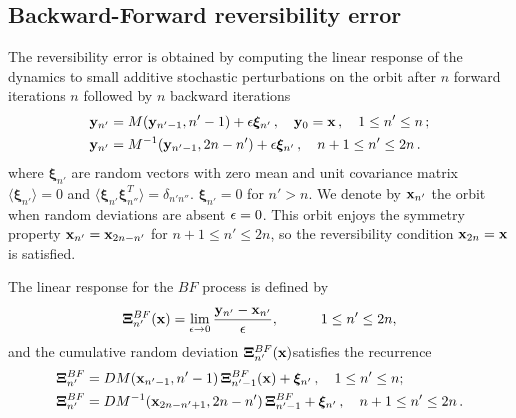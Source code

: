 \subsection{Backward-Forward reversibility error\label{subsection:bf}}
%
The reversibility error is obtained by computing the linear response of the dynamics to small additive stochastic perturbations on the orbit after $n$ forward iterations $n$ followed by $n$ backward iterations 
%
\begin{equation}
 \begin{split}
   &{\bf y}_{n'}  = M({\bf y}_{n'-1},n'-1) +\epsilon\boldsymbol{\xi}_{n'} \, ,  \quad {\bf y}_0={\bf x} \, , \quad 1\le n'\le n \, ; \\ 
   &{\bf y}_{n'} = M^{-1}({\bf y}_{ n'-1}, 2n-n')+\epsilon   \boldsymbol{\xi}_{n' } \, , \quad n+1\le n'\le 2n \, .
  \end{split}
\label{eq2-8}
\end{equation}
%
where $\boldsymbol{\xi}_{n'}$ are random vectors with zero mean and unit covariance matrix $\langle\boldsymbol{\xi}_{n'}\rangle=0$  and $\langle\boldsymbol{\xi}_{n'} \boldsymbol{\xi}_{n''}^T\rangle=\delta_{n' n''}$.
$\boldsymbol{\xi}_{n'}=0$ for $n'>n$. We denote by ${\bf x}_{n'}$ the orbit when random deviations are absent $\epsilon=0$. This orbit
enjoys the symmetry property ${\bf x}_{n'}= {\bf x}_{2n-n'}$ for $n+1\le n'\le 2n$, so the reversibility condition ${\bf x}_{2n}={\bf x}$ is satisfied.

The linear response for the $BF$ process is defined by 
%
\begin{equation}
   \boldsymbol{\Xi}^{BF}_{n'}(\xbf)  = \lim_{\eps\to 0}\frac{\ybf_{n'}-\xbf_{n'}}{ \eps},  \quad \qquad  1\le n'\le 2n,  %
\label{eq2-9}
\end{equation}  
%
and the cumulative random deviation $\boldsymbol{\Xi}^{BF}_{n'}({\bf x})$satisfies the recurrence 
%
\begin{equation}
  \begin{aligned}
  & \boldsymbol{\Xi}_{n'}^{BF} = DM({\bf x}_{n'-1},n'-1)\,\boldsymbol{\Xi}_{n'-1}^{BF}({\bf x})+ \boldsymbol{\xi}_{n'} \, , \quad 1\le n'\le n;\\ 
    & \boldsymbol{\Xi}_{n'}^{BF} = DM^{-1}({\bf x}_{2n-n' +1},2n-n')\, \boldsymbol{\Xi}_{n'-1}^{BF}    + \boldsymbol{\xi}_{n'} \, , \quad n+1 \le n'\le 2n \, .
  \end{aligned}
\label{eq2-10}
\end{equation}
%

